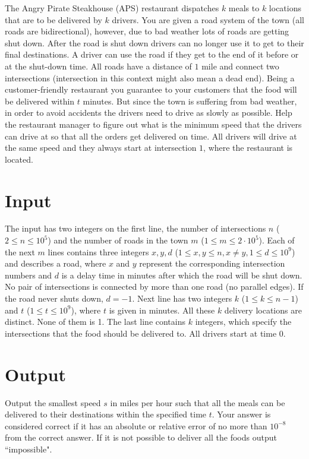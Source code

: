 
The Angry Pirate Steakhouse (APS) restaurant dispatches $k$ meals to $k$ locations that are to be delivered by $k$ drivers. You are given a road system of the town (all roads are bidirectional), however, due to bad weather lots of roads are getting shut down. After the road is shut down drivers can no longer use it to get to their final destinations. A driver can use the road if they get to the end of it before or at the shut-down time. All roads have a distance of $1$ mile and connect two intersections (intersection in this context might also mean a dead end). Being a customer-friendly restaurant you guarantee to your customers that the food will be delivered within  $t$ minutes. But since the town is suffering from bad weather, in order to avoid accidents the drivers need to drive as slowly as possible. Help the restaurant manager to figure out what is the minimum speed that the drivers can drive at so that all the orders get delivered on time. All drivers will drive at the same speed and they always start at intersection $1$, where the restaurant is located. 

\section*{Input}
The input has two integers on the first line, the number of intersections $n$ ($2 \leq n \leq 10^5$) and the number of roads in the town $m$ ($1 \leq m \leq 2\cdot10^5$). Each of the next $m$ lines contains three integers $x, y, d$ ($1 \leq x,y \leq n, x \neq y, 1 \leq d \leq 10^{9}$) and describes a road, where $x$ and $y$ represent the corresponding intersection numbers and $d$ is a delay time in minutes after which the road will be shut down. No pair of intersections is connected by more than one road (no parallel edges). If the road never shuts down, $d = -1$. 
Next line has two integers $k$ ($1 \leq k \leq {n-1}$) and $t$ ($1 \leq t \leq 10^{9}$), where $t$ is given in minutes. All these $k$ delivery locations are distinct. None of them is 1.
The last line contains $k$ integers, which specify the intersections that the food should be delivered to. All drivers start at time 0. 

\section*{Output}
Output the smallest speed $s$ in miles per hour such that all the meals can be delivered to their destinations within the specified time $t$. Your answer is considered correct if it has an absolute or relative error of no more than $10^{-8}$ from the correct answer. If it is not possible to deliver all the foods output ``impossible".
